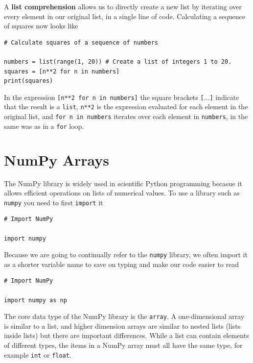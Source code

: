 \documentclass[a4paper]{article}
\begin{document}
A \textbf{list comprehension} allows us to directly create a new list by iterating over every element in our original list, in a single line of code. Calculating a sequence of squares now looks like
\begin{lstlisting}
# Calculate squares of a sequence of numbers

numbers = list(range(1, 20)) # Create a list of integers 1 to 20.
squares = [n**2 for n in numbers]
print(squares)
\end{lstlisting}
In the expression \texttt{[n**2 for n in numbers]}
the square brackets \texttt{[$\ldots$]}
indicate that the result is a \texttt{list},
\texttt{n**2} is the expression evaluated for each element in the original list, and \texttt{for n in numbers} iterates over each element in \texttt{numbers}, in the same was as in a \texttt{for} loop.

\section{NumPy Arrays}

The NumPy library is widely used in scientific Python programming becasue it allows efficient operations on lists of numerical values.\cite{numpy}
To use a library such as \texttt{numpy} you need to first \texttt{import} it
\begin{lstlisting}
# Import NumPy

import numpy
\end{lstlisting}
Because we are going to continually refer to the \texttt{numpy} library, we often import it as a shorter variable name to save on typing and make our code easier to read
\begin{lstlisting}
# Import NumPy

import numpy as np
\end{lstlisting}

The core data type of the NumPy library is the \texttt{array}. A  one-dimensional array is similar to a list, and higher dimension arrays are similar to nested lists (lists inside lists) but there are important differences.
While a list can contain elements of different types, the items in a NumPy array must all have the same type, for example \texttt{int} or \texttt{float}.
\end{document}
